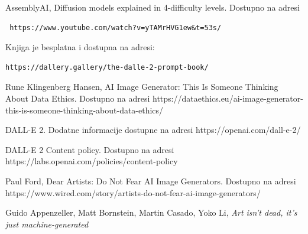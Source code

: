 \documentclass[12pt, letterpaper]{article}
\begin{document}
\begin{thebibliography}{10}
 AssemblyAI, Diffusion models explained in 4-difficulty levels. Dostupno na adresi\begin{verbatim} https://www.youtube.com/watch?v=yTAMrHVG1ew&t=53s/
\end{verbatim}

Knjiga je besplatna i dostupna na adresi:\begin{verbatim}https://dallery.gallery/the-dalle-2-prompt-book/\end{verbatim}

 Rune Klingenberg Hansen, AI Image Generator: This Is Someone Thinking About Data Ethics. Dostupno na adresi https://dataethics.eu/ai-image-generator-this-is-someone-thinking-about-data-ethics/

 DALL-E 2. Dodatne informacije dostupne na adresi https://openai.com/dall-e-2/

 DALL-E 2 Content policy. Dostupno na adresi https://labs.openai.com/policies/content-policy

 Paul Ford, Dear Artists: Do Not Fear AI Image Generators. Dostupno na adresi https://www.wired.com/story/artists-do-not-fear-ai-image-generators/

 Guido Appenzeller, Matt Bornstein, Martin Casado, Yoko Li, \textit{Art isn't dead, it's just machine-generated}

\end{thebibliography}
\end{document}
